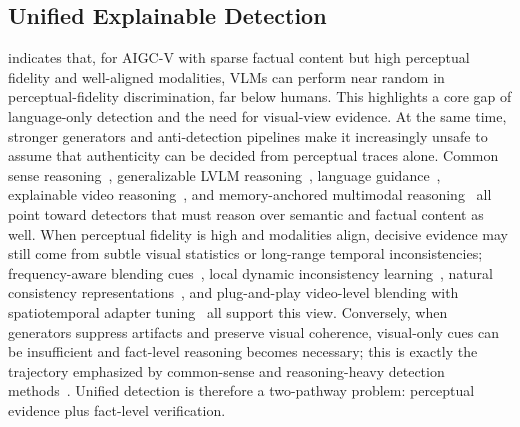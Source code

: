 \subsection{Unified Explainable Detection}
\label{sec:dualview-factual}
\citet{wang2025videorealitytestaigenerated} indicates that, for AIGC-V with sparse factual content but high perceptual fidelity and well-aligned modalities, VLMs can perform near random in perceptual-fidelity discrimination, far below humans. This highlights a core gap of language-only detection and the need for visual-view evidence. At the same time, stronger generators and anti-detection pipelines make it increasingly unsafe to assume that authenticity can be decided from perceptual traces alone. Common sense reasoning~\citep{zhang2024common}, generalizable LVLM reasoning~\citep{Yu2025LVLMDFD}, language guidance~\citep{Shen2025AuthGuard}, explainable video reasoning~\citep{gao2025david}, and memory-anchored multimodal reasoning~\citep{chen2025memory} all point toward detectors that must reason over semantic and factual content as well. When perceptual fidelity is high and modalities align, decisive evidence may still come from subtle visual statistics or long-range temporal inconsistencies; frequency-aware blending cues~\citep{zhou2024freqblender}, local dynamic inconsistency learning~\citep{gu2022delving}, natural consistency representations~\citep{zhang2024learning}, and plug-and-play video-level blending with spatiotemporal adapter tuning~\citep{yan2025generalizing} all support this view. Conversely, when generators suppress artifacts and preserve visual coherence, visual-only cues can be insufficient and fact-level reasoning becomes necessary; this is exactly the trajectory emphasized by common-sense and reasoning-heavy detection methods~\citep{zhang2024common,Yu2025LVLMDFD,Shen2025AuthGuard,gao2025david}. Unified detection is therefore a two-pathway problem: perceptual evidence plus fact-level verification.

